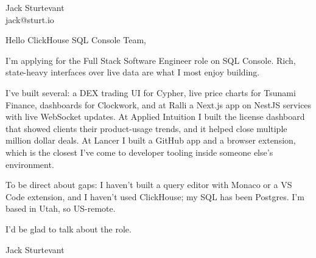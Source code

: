 \documentclass[11pt]{article}
\begin{document}
\raggedright

{\namefont\fontsize{20pt}{24pt}\selectfont Jack Sturtevant}\\[-0.3em]
jack@sturt.io

\vspace{1.2em}

Hello ClickHouse SQL Console Team,

I'm applying for the Full Stack Software Engineer role on SQL Console. Rich, state-heavy interfaces over live data are what I most enjoy building.

I've built several: a DEX trading UI for Cypher, live price charts for Tsunami Finance, dashboards for Clockwork, and at Ralli a Next.js app on NestJS services with live WebSocket updates. At Applied Intuition I built the license dashboard that showed clients their product-usage trends, and it helped close multiple million dollar deals. At Lancer I built a GitHub app and a browser extension, which is the closest I've come to developer tooling inside someone else's environment.

To be direct about gaps: I haven't built a query editor with Monaco or a VS Code extension, and I haven't used ClickHouse; my SQL has been Postgres. I'm based in Utah, so US-remote.

I'd be glad to talk about the role.

\vspace{0.6em}
Jack Sturtevant
\end{document}
